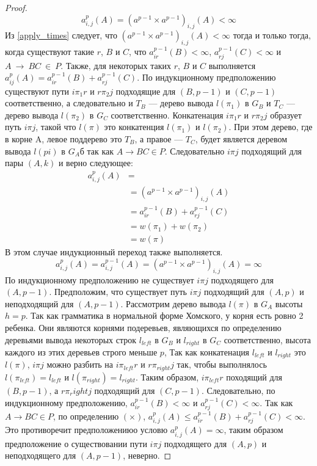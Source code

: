 \documentclass[14pt]{matmex-diploma}
\theoremstyle{definition}
\begin{document}
\begin{proof}
            \begin{equation*}
               a^p_{i,j}(A) = (a^{p-1}\times a^{p-1})_{i,j}(A) < \infty
            \end{equation*}
            Из \eqref{apply_times} следует, что $(a^{p-1}\times a^{p-1})_{i,j}(A) < \infty$ тогда и только тогда, когда существуют такие $r$, $B$ и $C$, что $a^{p-1}_{ir}(B) < \infty$, $a^{p-1}_{rj}(C) < \infty$ и $A~\rightarrow~BC~\in~P$. Также, для некоторых таких $r$, $B$ и $C$ выполняется $a^{p}_{ij}(A) = a^{p-1}_{ir}(B) + a^{p-1}_{rj}(C)$. По индукционному предположению существуют пути $i\pi_1 r$ и $r\pi_2 j$ подходящие для $(B, p-1)$ и $(C, p-1)$ соответственно, а следовательно и $T_B$ --- дерево вывода $l(\pi_1)$ в $G_B$ и $T_C$ --- дерево вывода $l(\pi_2)$ в $G_C$ соответственно. Конкатенация $i\pi_1 r$ и $r\pi_2 j$ образует путь $i\pi j$, такой что $l(\pi)$ это конкатенция $l(\pi_1)$ и $l(\pi_2)$. При этом дерево, где в корне A, левое поддерево это $T_B$, а правое --- $T_C$, будет является деревом вывода $l(pi)$ в $G_A$б так как $A\rightarrow BC \in P$. Следовательно $i\pi j$ подходящий для пары $(A, k)$ и верно следующее:
            \begin{align*}
               a^{p}_{i,j}(A) &=\\
                              &= (a^{p-1}\times a^{p-1})_{i,j}(A)\\
                              &= a^{p-1}_{ir}(B) + a^{p-1}_{rj}(C)\\
                              &= w(\pi_1) + w(\pi_2)\\
                              &= w(\pi)
            \end{align*}
            В этом случае индукционный переход также выполняется.
            \begin{equation*}
               a^p_{i,j}(A) = a^{p-1}_{i,j}(A) = (a^{p-1}\times a^{p-1})_{i,j}(A) = \infty
            \end{equation*}
            По индукционному предположению не существует $i\pi j$ подходящего для $(A, p-1)$. Предположим, что существует путь $i\pi j$ подходящий для $(A, p)$ и неподходящий для $(A, p-1)$. Рассмотрим дерево вывода $l(\pi)$ в $G_A$ высоты $h=p$. Так как грамматика в нормальной форме Хомского, у корня есть ровно 2 ребенка. Они являются корнями подеревьев, являющихся по определению деревьями вывода некоторых строк $l_{left}$ в $G_B$ и $l_{right}$ в $G_C$ соответственно, высота каждого из этих деревьев строго меньше $p$, Так как конкатенация $l_{left}$ и $l_{right}$ это $l(\pi)$, $i\pi j$ можно разбить на $i\pi_{left} r$ и $r\pi_{right} j$ так, чтобы выполнялось $l(\pi_{left}) = l_{left}$ и $l(\pi_{right}) = l_{right}$. Таким образом, $i\pi_{left} r$ походящий для $(B, p-1)$, а $r\pi{_right} j$ подходящий для $(C, p-1)$. Следовательно, по индукционному предположению, $a^{p-1}_{ir}(B) < \infty$ и $a^{p-1}_{rj}(C) < \infty$. Так как $A\rightarrow BC \in P$, по определению $(\times)$, $a^p_{i,j}(A) \le a^{p-1}_{ir}(B) + a^{p-1}_{rj}(C) < \infty$. Это противоречит предположениюо условю $a^p_{i,j}(A) = \infty$, таким образом предположение о существовании пути $i\pi j$ подходящего для $(A, p)$ и неподходящего для $(A, p-1)$, неверно.
            

\end{proof}
\end{document}
